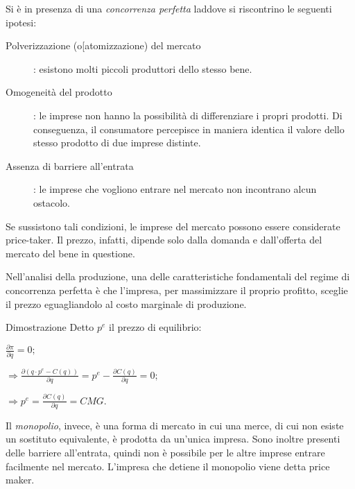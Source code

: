 Si è in presenza di una \emph{concorrenza perfetta} laddove si riscontrino le 
seguenti ipotesi: %
\begin{description}
 \item[Polverizzazione (o[atomizzazione) del mercato]: esistono molti 
piccoli produttori dello stesso bene.
 \item[Omogeneità del prodotto]: le imprese non hanno la possibilità di 
differenziare i propri prodotti. Di conseguenza, il consumatore percepisce in 
maniera identica il valore dello stesso prodotto di due imprese distinte.
 \item[Assenza di barriere all'entrata]: le imprese che vogliono entrare nel 
mercato non incontrano alcun ostacolo.
\end{description}

Se sussistono tali condizioni, le imprese del mercato possono essere 
considerate price-taker. 
Il prezzo, infatti, dipende solo dalla domanda e dall'offerta 
del mercato del bene in questione. %

Nell'analisi della produzione, una delle caratteristiche fondamentali del 
regime di concorrenza perfetta è che l'impresa, per massimizzare il proprio 
profitto, sceglie il prezzo eguagliandolo al costo marginale di produzione.

Dimostrazione
Detto \(p^e\) il prezzo di equilibrio:

\(\frac{\partial \pi}{\partial q}=0;\)

\(\Rightarrow \frac{\partial (q\cdot p^e-C(q))}{\partial 
q}=p^e-\frac{\partial C(q)}{\partial q}=0;\)

\(\Rightarrow p^e=\frac{\partial C(q)}{\partial q}=CMG .\)

Il \emph{monopolio}, invece, è una forma di mercato in cui una merce, di cui 
non esiste un sostituto equivalente, è prodotta da un'unica 
impresa.
Sono inoltre presenti delle barriere all'entrata, quindi non è possibile per le 
altre imprese entrare facilmente nel mercato. 
L'impresa che detiene il monopolio viene detta price maker.

% 
% 
% 
% 
% 




